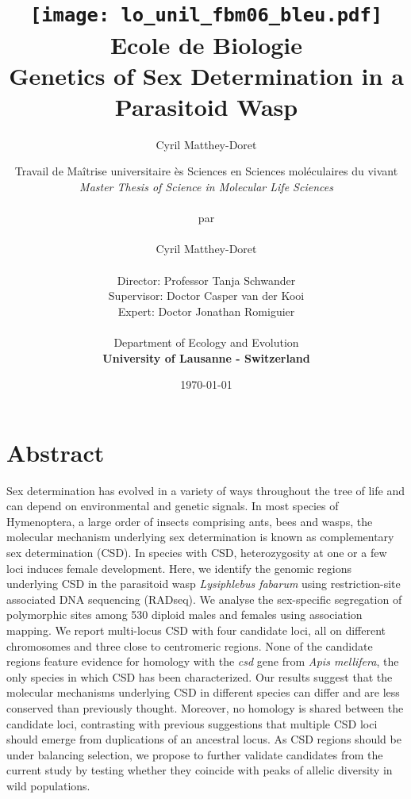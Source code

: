 \documentclass[11pt,a4paper]{report}
\author{Cyril Matthey-Doret}
\title{
\texttt{[image: lo\_unil\_fbm06\_bleu.pdf]} \\
\vspace*{0.5in}
\textbf{Ecole de Biologie}\\
\vspace*{0.5in}
\textbf{Genetics of Sex Determination in a Parasitoid Wasp}}
\author{Travail de Maîtrise universitaire ès Sciences en Sciences moléculaires du vivant\\
		\textit{Master Thesis of Science in Molecular Life Sciences}\\
        		\vspace*{0.2in}\\
                par\\
                \vspace*{0.1in}\\
		\Large{Cyril Matthey-Doret}\\
        		\vspace*{0.2in} \\
        Director: Professor Tanja Schwander\\
        Supervisor: Doctor Casper van der Kooi\\
        Expert: Doctor Jonathan Romiguier\\
        \vspace*{0.2in}\\
		Department of Ecology and Evolution\\
        \textbf{University of Lausanne - Switzerland}\\
       } \date{\today}
\begin{document}
\renewcommand{\headrulewidth}{1pt}
\maketitle

\tableofcontents
\newpage

\section{Abstract}
Sex determination has evolved in a variety of ways throughout the tree of life and can depend on environmental and genetic signals. In most species of Hymenoptera, a large order of insects comprising ants, bees and wasps, the molecular mechanism underlying sex determination is known as complementary sex determination (CSD). In species with CSD, heterozygosity at one or a few loci induces female development. Here, we identify the genomic regions underlying CSD in the parasitoid wasp \textit{Lysiphlebus fabarum} using restriction-site associated DNA sequencing (RADseq). We analyse the sex-specific segregation of polymorphic sites among 530 diploid males and females using association mapping. We report multi-locus CSD with four candidate loci, all on different chromosomes and three close to centromeric regions. None of the candidate regions feature evidence for homology with the \textit{csd} gene from \textit{Apis mellifera}, the only species in which CSD has been characterized. Our results suggest that the molecular mechanisms underlying CSD in different species can differ and are less conserved than previously thought. Moreover, no homology is shared between the candidate loci, contrasting with previous suggestions that multiple CSD loci should emerge from duplications of an ancestral locus. As CSD regions should be under balancing selection, we propose to further validate candidates from the current study by testing whether they coincide with peaks of allelic diversity in wild populations.
\end{document}
